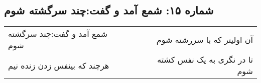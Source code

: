\begin{center}
\section*{شماره ۱۵: شمع آمد و گفت:‌چند سرگشته شوم}
\label{sec:015}
\begin{longtable}{l p{0.5cm} r}
شمع آمد و گفت:‌چند سرگشته شوم
&&
آن اولیتر که با سررشته شوم
\\
هرچند که بینفس زدن زنده نیم
&&
تا در نگری به یک نفس کشته شوم
\\
\end{longtable}
\end{center}
